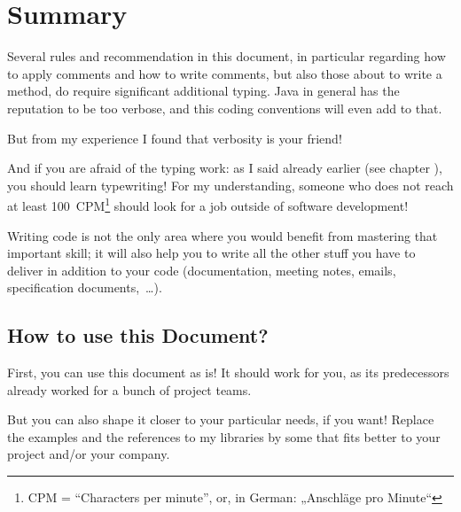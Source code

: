 \chapter{Summary}\label{sec:Summary}
Several rules and recommendation in this document, in particular regarding how to apply comments and how to write comments, but also those about to write a method, do require significant additional typing. Java in general has the reputation to be too verbose, and this coding conventions will even add to that.

But from my experience I found that verbosity is your friend!

And if you are afraid of the typing work: as I said already earlier (see chapter ), you should learn typewriting! For my understanding, someone who does not reach at least 100~CPM\footnote{CPM = “Characters per minute”, or, in German: „Anschläge pro Minute“} should look for a job outside of software development!

Writing code is not the only area where you would benefit from mastering that important skill; it will also help you to write all the other stuff you have to deliver in addition to your code (documentation, meeting notes, emails, specification documents,~…).

\section{How to use this Document?}
First, you can use this document as is! It should work for you, as its predecessors already worked for a bunch of project teams.

But you can also shape it closer to your particular needs, if you want! Replace the examples and the references to my libraries by some that fits better to your project and/or your company.


